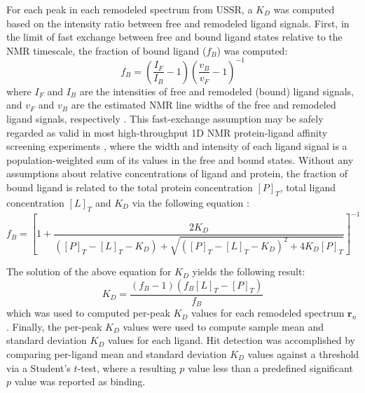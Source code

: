 \begin{doublespace}
For each peak in each remodeled spectrum from USSR, a $K_D$ was computed based
on the intensity ratio between free and remodeled ligand signals. First, in the
limit of fast exchange between free and bound ligand states relative to the NMR
timescale, the fraction of bound ligand ($f_B$) was computed:
\begin{equation}
f_B =
 \left( \frac{I_F}{I_B} - 1 \right)
 \left( \frac{v_B}{v_F} - 1 \right)^{-1}
\end{equation}
where $I_F$ and $I_B$ are the intensities of free and remodeled (bound) ligand
signals, and $v_F$ and $v_B$ are the estimated NMR line widths of the free and
remodeled ligand signals, respectively \cite{shortridge:jcomb2008}. This
fast-exchange assumption may be safely regarded as valid in most
high-throughput 1D \hnmr{} NMR protein-ligand affinity screening experiments
\cite{lepre:chemrev2004}, where the width and intensity of each ligand signal
is a population-weighted sum of its values in the free and bound states.
Without any assumptions about relative concentrations of ligand and protein,
the fraction of bound ligand is related to the total protein concentration
$[P]_T$, total ligand concentration $[L]_T$ and $K_D$ via the following
equation \cite{shortridge:jcomb2008}:
\begin{equation}
f_B = \left[
  1 + \frac{2 K_D}{
    ([P]_T - [L]_T - K_D) + \sqrt{([P]_T - [L]_T - K_D)^2 + 4 K_D [P]_T}
  }
\right]^{-1}
\end{equation}

The solution of the above equation for $K_D$ yields the following result:
\begin{equation}
K_D = \frac{(f_B - 1)(f_B [L]_T - [P]_T)}{f_B}
\end{equation}
which was used to computed per-peak $K_D$ values for each remodeled spectrum
$\mathbf{r}_n$. Finally, the per-peak $K_D$ values were used to compute sample
mean and standard deviation $K_D$ values for each ligand. Hit detection was
accomplished by comparing per-ligand mean and standard deviation $K_D$ values
against a threshold via a Student's $t$-test, where a resulting $p$ value less
than a predefined significant $p$ value was reported as binding.
\end{doublespace}

